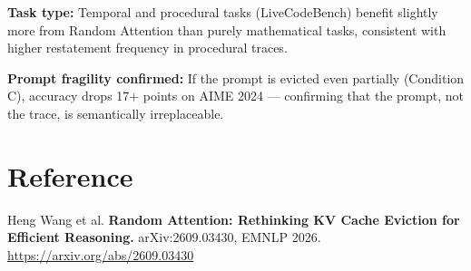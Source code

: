 \documentclass[10pt,twocolumn]{article}
\begin{document}
\textbf{Task type:} Temporal and procedural tasks (LiveCodeBench)
benefit slightly more from Random Attention than purely mathematical
tasks, consistent with higher restatement frequency in procedural traces.

\textbf{Prompt fragility confirmed:} If the prompt is evicted even
partially (Condition C), accuracy drops 17+ points on AIME 2024 ---
confirming that the prompt, not the trace, is semantically irreplaceable.

\section*{Reference}

Heng Wang et al. \textbf{Random Attention: Rethinking KV Cache Eviction
for Efficient Reasoning.} arXiv:2609.03430, EMNLP 2026.
\url{https://arxiv.org/abs/2609.03430}
\end{document}
